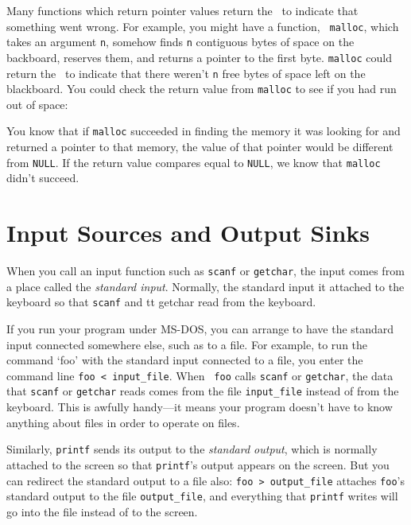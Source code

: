 Many functions which return pointer values return the \np\ to indicate
that something went wrong.  For example, you might have a function, {\tt
malloc}, which takes an argument {\tt n}, somehow finds {\tt n}
contiguous bytes of space on the backboard, reserves them, and returns a
pointer to the first byte.  {\tt malloc} could return the \np\ to
indicate that there weren't {\tt n} free bytes of space left on the
blackboard.  You could check the return value from {\tt malloc} to see
if you had run out of space:  
\begin{flushleft}
\verb% char *buf;% \\*
\verb% buf = malloc(1000);% \\*
\verb% if (buf == NULL) {% \\*
\verb%   printf("Out of memory.\n"); % \\*
\verb%   abort();% \\*
\verb% }% \\*
\verb% . . . %
\end{flushleft}

You know that if {\tt malloc} succeeded in finding the memory it was
looking for and returned a pointer to that memory, the value of that
pointer would be different from {\tt NULL}.  If the return value
compares equal to {\tt NULL}, we know that {\tt malloc} didn't succeed.

\section{Input Sources and Output Sinks}

When you call an input function such as {\tt scanf} or {\tt getchar},
the input comes from a place called the {\em standard input}.  Normally,
the standard input it attached to the keyboard so that {\tt scanf} and
{tt getchar} read from the keyboard.  

If you run your program under MS-DOS, you can arrange to have the
standard input connected somewhere else, such as to a file.  For
example, to run the command `foo' with the standard input connected to a
file, you enter the command line {\tt foo < input\_file}.  When {\tt
foo} calls {\tt scanf} or {\tt getchar}, the data that {\tt scanf} or
{\tt getchar} reads comes from the file {\tt input\_file} instead of
from the keyboard.  This is awfully handy---it means your program
doesn't have to know anything about files in order to operate on files.

Similarly, {\tt printf} sends its output to the {\em standard output}\/,
which is normally attached to the screen so that {\tt printf}'s output
appears on the screen.  But you can redirect the standard output to a
file also: {\tt foo > output\_file} attaches {\tt foo}'s standard output
to the file {\tt output\_file}, and everything that {\tt printf} writes
will go into the file instead of to the screen.

